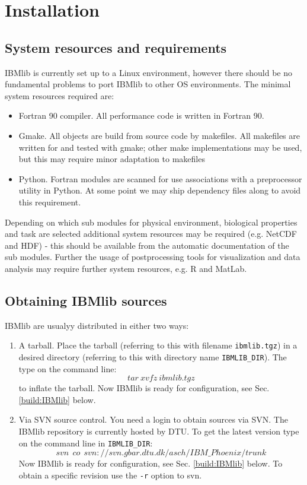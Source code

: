 \chapter{Installation}

\section{System resources and requirements}

IBMlib is currently set up to a Linux environment, however
there should be no fundamental problems to port IBMlib to
other OS environments.
The minimal system resources required are:
\begin{itemize}
  \item Fortran 90 compiler. All performance code is written in Fortran 90.
  \item Gmake. All objects are build from source code by makefiles.
        All makefiles are written for and tested with gmake; other
        make implementations may be used, but this may require 
        minor adaptation to makefiles
  \item Python. Fortran modules are scanned for use associations with a 
        preprocessor utility in Python. At some point we may ship 
        dependency files along to avoid this requirement.

\end{itemize}
Depending on which sub modules for physical environment, biological
properties and task  are selected additional system resources
may be required (e.g. NetCDF and HDF) - this should be available from the 
automatic documentation of the sub modules. Further the usage of 
postprocessing tools for visualization and data analysis may require 
further system resources, e.g. R and MatLab.  

\section{Obtaining IBMlib sources} 

IBMlib are usualyy distributed in either two ways:
\begin{enumerate}
  \item A tarball. Place the tarball 
        (referring to this with filename {\tt ibmlib.tgz}) in a desired
        directory (referring to this with directory name {\tt IBMLIB\_DIR}).
        The type on the command line:
        \[ tar \ xvfz \ ibmlib.tgz
        \]
        to inflate the tarball. 
        Now IBMlib is ready for configuration, see Sec. \ref{build:IBMlib} below.
  \item Via SVN source control. You need a login to 
        obtain  sources via SVN. The IBMlib repository is currently hosted by 
        DTU. To get the latest version type on the command line in {\tt IBMLIB\_DIR}:
        \[ svn \ \ co  \ \ svn://svn.gbar.dtu.dk/asch/IBM\_Phoenix/trunk
        \]  
        Now IBMlib is ready for configuration, see Sec. \ref{build:IBMlib} below.
        To obtain a specific revision use the  {\tt -r} option to svn.
\end{enumerate}   

